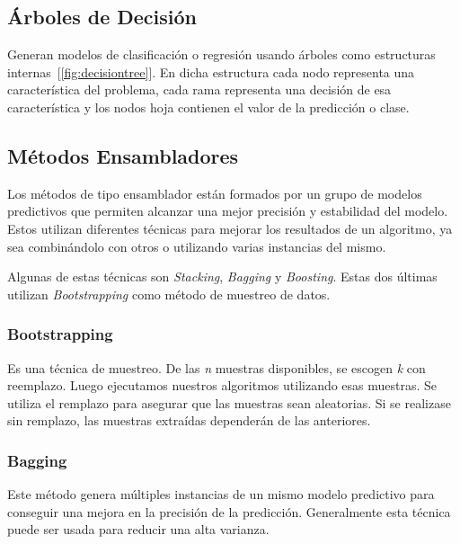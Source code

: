 \subsection[Árboles de Decisión]{Árboles de Decisión~\cite{breiman2017classification}}
\label{sec:decision_tree}
Generan modelos de clasificación o regresión usando árboles como estructuras internas~[\cref{fig:decisiontree}]. En dicha estructura cada nodo representa una característica del problema, cada rama representa una decisión de esa característica y los nodos hoja contienen el valor de la predicción o clase.



\subsection[Métodos Ensambladores]{Métodos Ensambladores~\cite{breiman1999pasting, breiman1996bagging,louppe2012ensembles}}
Los métodos de tipo ensamblador están formados por un grupo de modelos predictivos que permiten alcanzar una mejor precisión y estabilidad del modelo. Estos utilizan diferentes técnicas para mejorar los resultados de un algoritmo, ya sea combinándolo con otros o utilizando varias instancias del mismo.

Algunas de estas técnicas son \textit{Stacking}, \textit{Bagging} y \textit{Boosting}. Estas dos últimas utilizan \textit{Bootstrapping} como método de muestreo de datos.

\subsubsection{Bootstrapping}
Es una técnica de muestreo. De las \textit{n} muestras disponibles, se escogen \textit{k} con reemplazo. Luego ejecutamos nuestros algoritmos utilizando esas muestras. Se utiliza el remplazo para asegurar que las muestras sean aleatorias. Si se realizase sin remplazo, las muestras extraídas dependerán de las anteriores.


\subsubsection[Bagging]{Bagging~\cite{breiman1996bagging}}

Este método genera  múltiples instancias de un mismo modelo predictivo para conseguir una mejora en la precisión de la predicción. Generalmente esta técnica puede ser usada para reducir una alta varianza.


